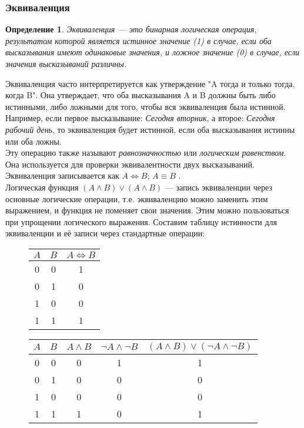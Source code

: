 \documentclass[12pt]{article}
\newtheorem{definition}{Определение}[section]
\theoremstyle{problem_style}
\begin{document}
\subsubsection{Эквиваленция}
\begin{definition}
Эквиваленция — это бинарная логическая операция, результатом которой является истинное значение (1) в случае, если оба высказывания имеют одинаковые значения, и ложное значение (0) в случае, если значения высказываний различны.
\end{definition}
Эквиваленция часто интерпретируется как утверждение "A тогда и только тогда, когда B". Она утверждает, что оба высказывания A и B должны быть либо истинными, либо ложными для того, чтобы вся эквиваленция была истинной. Например, если первое высказывание: \textit{Сегодня вторник}, а второе: \textit{Сегодня рабочий день}, то эквиваленция будет истинной, если оба высказывания истинны или оба ложны.\\
Эту операцию также называют \textit{равнозначностью} или \textit{логическим равенством}. Она используется для проверки эквивалентности двух высказываний. Эквиваленция записывается как \(A \Leftrightarrow B\); \(A \equiv B\) .\\
Логическая функция \((A \land B) \lor (A \land B)\) — запись эквиваленции через основные логические операции, т.е. эквиваленцию можно заменить этим выражением, и функция не поменяет свои значения. Этим можно пользоваться при упрощении логического выражения.
Составим таблицу истинности для эквиваленции и её записи через стандартные операции:
\begin{figure}[h!]
    \begin{minipage}{0.25\linewidth}
        \centering
        \begin{tabular}{|c|c|c|}
        \hline
        $A$ & $B$ & $A \Leftrightarrow B$ \\
        \hline
        0 & 0 & 1 \\
        0 & 1 & 0 \\
        1 & 0 & 0 \\
        1 & 1 & 1 \\
        \hline
        \end{tabular}
    \end{minipage}
    \hspace{0.2cm}
    \begin{minipage}{0.85\linewidth}
        \centering
        \begin{tabular}{|c|c|c|c|c|}
        \hline
        $A$ & $B$ & $A \land B$ & $\lnot A \land \lnot B$ & $(A \land B) \lor (\lnot A \land \lnot B)$ \\
        \hline
        0 & 0 & 0 & 1 & 1\\
        0 & 1 & 0 & 0 & 0\\
        1 & 0 & 0 & 0 & 0\\
        1 & 1 & 1 & 0 & 1\\
        \hline
        \end{tabular}
    \end{minipage}
\end{figure}
\end{document}
